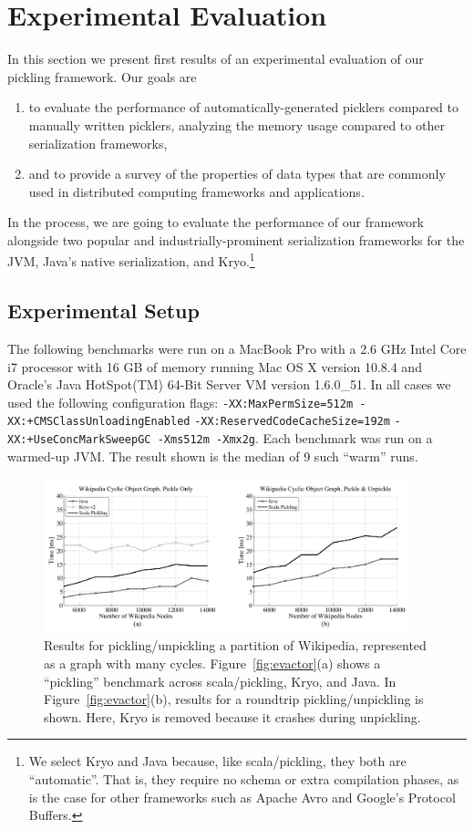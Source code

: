 \documentclass[10pt]{sigplanconf}
\theoremstyle{definition}
\theoremstyle{definition}
\begin{document}
\section{Experimental Evaluation}
\label{sec:evaluation}

In this section we present first results of an experimental evaluation
of our pickling framework. Our goals are
\begin{enumerate}
\item to evaluate the performance of automatically-generated picklers
  compared to manually written picklers, analyzing the memory usage
  compared to other serialization frameworks,
\item and to provide a survey of the properties of data types that are
  commonly used in distributed computing frameworks and applications.
\end{enumerate}\noindent
In the process, we are going to evaluate the performance of our
framework alongside two popular and industrially-prominent serialization frameworks
for the JVM, Java's native serialization, and Kryo.\footnote{We select Kryo and Java because, like scala/pickling, they both are ``automatic''. That is, they require no schema or extra compilation phases, as is the case for other frameworks such as Apache Avro and Google's Protocol Buffers.}

\subsection{Experimental Setup}

The following benchmarks were run on a MacBook Pro with a 2.6 GHz
Intel Core i7 processor with 16 GB of memory running Mac OS X version
10.8.4 and Oracle's Java HotSpot(TM) 64-Bit Server VM version
1.6.0\_51. In all cases we used the following configuration flags:
\texttt{-XX:MaxPermSize=512m -XX:+CMSClassUnloadingEnabled}
\linebreak
\texttt{-XX:ReservedCodeCacheSize=192m}
\texttt{-XX:+UseConcMarkSweepGC  -Xms512m -Xmx2g}.
Each benchmark was run on a warmed-up JVM. The result shown is the median of 9 such
``warm'' runs.

\begin{figure}[ht!]
 \centering
 \includegraphics[width=0.95\textwidth]{wikigraph.pdf}
 \caption{Results for pickling/unpickling a partition of Wikipedia, represented as a graph with many cycles. Figure~\ref{fig:evactor}(a) shows a ``pickling'' benchmark across scala/pickling, Kryo, and Java. In Figure~\ref{fig:evactor}(b), results for a roundtrip pickling/unpickling is shown. Here, Kryo is removed because it crashes during unpickling.}
 \label{fig:wikigraph}
\end{figure}
\end{document}
